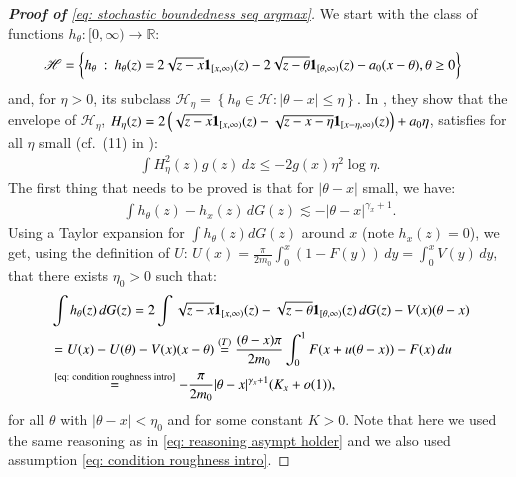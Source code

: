 \begin{proof}[\hypertarget{proof of lemma 3}{\textbf{Proof of}} \eqref{eq: stochastic boundedness seq argmax}]
We start with the class of functions $h_\theta:[0, \infty) \rightarrow \mathbb{R}$:
\begin{align*}
\mathscr{H}= \bigg\{h_\theta \: : \: h_\theta(z) =& \: 2 \sqrt{z-x} \mathbf{1}_{[x, \infty)}(z)-2 \sqrt{z-\theta} \mathbf{1}_{[\theta, \infty)}(z)-a_0(x-\theta), \theta \geq 0 \bigg\}
\end{align*}
and, for $\eta>0$, its subclass $ \mathscr{H}_\eta=\left\{h_\theta \in \mathscr{H}:|\theta-x| \leq \eta\right\}$.
In \cite{1}, they show that the envelope of $\mathscr{H}_\eta$, $H_\eta(z)=2\left(\sqrt{z-x} \mathbf{1}_{[x, \infty)}(z)-\sqrt{z-x-\eta} \mathbf{1}_{[x-\eta, \infty)}(z)\right)+a_0 \eta$, satisfies for all $\eta$ small (cf.\ (11) in \cite{1}):
\begin{align}\label{eq: bound on envelope}
\int H_\eta^2(z) g(z) \, d z \leq-2 g(x) \eta^2 \log \eta.    
\end{align}
The first thing that needs to be proved is that for $|\theta -x|$ small, we have:
\begin{align*}
    \int  h_\theta(z) - h_x (z) \, d G(z) \lesssim - |\theta - x|^{\gamma_x+ 1}.
\end{align*}
Using a Taylor expansion for $\int h_\theta(z) d G(z)$ around $x$ (note $h_x(z) = 0$), we get, using the definition of $U$: $U(x)=\frac{\pi}{2 m_0} \int_0^x(1-F(y)) \, d y =\int_0^x V(y) \, d y$, that there exists $\eta_0 > 0$ such that:
\begin{align*}
&\int h_\theta(z) \, d G(z) = 2 \int \sqrt{z-x} \mathbf{1}_{[x,\infty)}(z) -  \sqrt{z-\theta} \mathbf{1}_{[\theta,\infty)}(z) \, dG(z)  - V(x) (\theta-x) \\ 
&= U(x) - U(\theta) - V(x)(x-\theta) \stackrel{(T)}{=} \frac{(\theta-x)\pi}{2 m_0} \int_{0}^{1} F(x + u(\theta-x)) -F(x) \, du  \\
&\stackrel{\text{\eqref{eq: condition roughness intro}}}{=}-\frac{\pi}{2 m_0} |\theta - x|^{\gamma_x+ 1}(K_x + o(1)),
\end{align*}
for all $\theta$ with $|\theta-x|<\eta_0$ and for some constant $K>0$. Note that here we used the same reasoning as in \eqref{eq: reasoning asympt holder} and we also used assumption \eqref{eq: condition roughness intro}. 


\end{proof}
